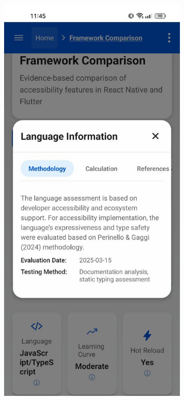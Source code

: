 \begin{figure}[ht]
    \centering
    \begin{subfigure}[b]{0.48\textwidth}
        \centering
        \includegraphics[width=\linewidth, alt={First part of Language in Overview tab of the Frameworks Comparison screen}]{img/language-information.jpg}

\end{subfigure}
\end{figure}
